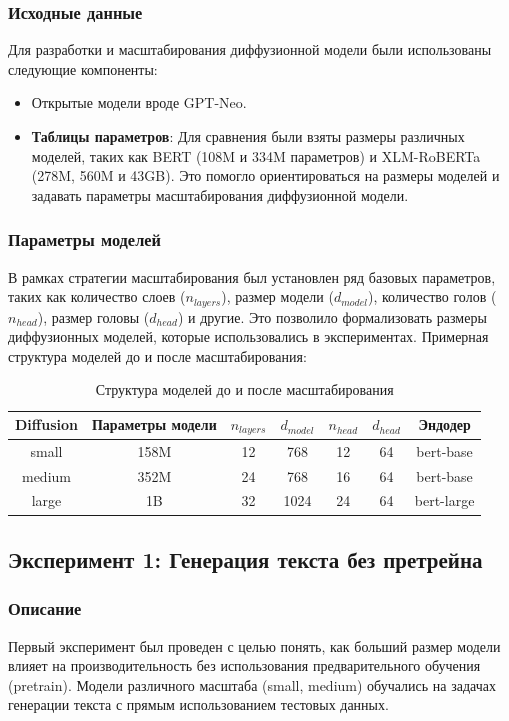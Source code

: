 \documentclass[a4paper, 12pt]{article}
\begin{document}
\subsubsection{Исходные данные}
Для разработки и масштабирования диффузионной модели были использованы следующие компоненты:

\begin{itemize}
    \item Открытые модели вроде GPT-Neo.
    \item \textbf{Таблицы параметров}: Для сравнения были взяты размеры различных моделей, таких как BERT (108M и 334M параметров) и XLM-RoBERTa (278M, 560M и 43GB). Это помогло ориентироваться на размеры моделей и задавать параметры масштабирования диффузионной модели.
\end{itemize}

\subsubsection{Параметры моделей}
В рамках стратегии масштабирования был установлен ряд базовых параметров, таких как количество слоев ($n_{layers}$), размер модели ($d_{model}$), количество голов ($n_{head}$), размер головы ($d_{head}$) и другие. Это позволило формализовать размеры диффузионных моделей, которые использовались в экспериментах. Примерная структура моделей до и после масштабирования:

\begin{table}[h!]
\caption{Структура моделей до и после масштабирования}
\centering
\begin{tabular}{|c|c|c|c|c|c|c|}
\hline
\textbf{Diffusion} & \textbf{Параметры модели} & $n_{layers}$ & $d_{model}$ & $n_{head}$ & $d_{head}$ & \textbf{Эндодер} \\ \hline
small & 158M & 12 & 768 & 12 & 64 & bert-base \\ \hline
medium & 352M & 24 & 768 & 16 & 64 & bert-base \\ \hline
large & 1B & 32 & 1024 & 24 & 64 & bert-large \\ \hline
\end{tabular}
\end{table}

\subsection{Эксперимент 1: Генерация текста без претрейна}

\subsubsection{Описание}
Первый эксперимент был проведен с целью понять, как больший размер модели влияет на производительность без использования предварительного обучения (pretrain). Модели различного масштаба (small, medium) обучались на задачах генерации текста с прямым использованием тестовых данных.
\end{document}
